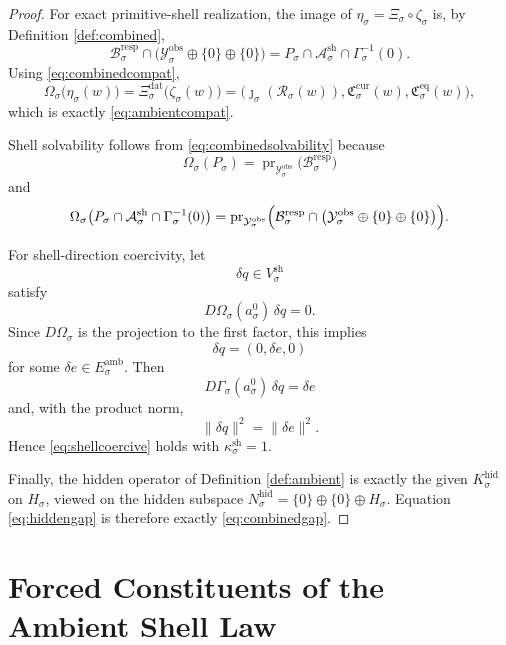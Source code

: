 \documentclass[11pt]{article}
\newcommand{\Reduction}[1]{\mathcal R_{#1}}
\newcommand{\CurrentCarrier}[1]{\mathfrak C_{#1}^{\mathrm{cur}}}
\newcommand{\EqCarrier}[1]{\mathfrak C_{#1}^{\mathrm{eq}}}
\newcommand{\DataSpace}[1]{\mathcal Y_{#1}^{\mathrm{obs}}}
\newcommand{\AmbientBody}[1]{P_{#1}}
\newcommand{\AmbientRead}[1]{\Omega_{#1}}
\newcommand{\AmbientShellLaw}[1]{\Gamma_{#1}}
\newcommand{\ShellAffine}[1]{\mathcal A_{#1}^{\mathrm{sh}}}
\newcommand{\ShellVector}[1]{V_{#1}^{\mathrm{sh}}}
\newcommand{\HiddenSpace}[1]{N_{#1}^{\mathrm{hid}}}
\newcommand{\HiddenOperator}[1]{K_{#1}^{\mathrm{hid}}}
\newcommand{\AmbientEmbed}[1]{\eta_{#1}}
\newcommand{\AmbientRef}[1]{a_{#1}^{0}}
\newcommand{\AmbientTarget}[1]{E_{#1}^{\mathrm{amb}}}
\newcommand{\ResponseMap}[1]{\Xi_{#1}}
\newcommand{\ResponseData}[1]{\Xi_{#1}^{\mathrm{dat}}}
\newcommand{\ResponseImage}[1]{\mathcal B_{#1}^{\mathrm{resp}}}
\newcommand{\GapSpace}[1]{H_{#1}}
\newcommand{\ProtoEmbed}[1]{\zeta_{#1}}
\begin{document}
\begin{proof}
For exact primitive-shell realization, the image of \(\AmbientEmbed{\sigma}=\ResponseMap{\sigma}\circ\ProtoEmbed{\sigma}\) is, by Definition \ref{def:combined},
\[
\ResponseImage{\sigma}\cap
\bigl(
\DataSpace{\sigma}\oplus\{0\}\oplus\{0\}
\bigr)
=
\AmbientBody{\sigma}\cap \ShellAffine{\sigma}\cap \AmbientShellLaw{\sigma}^{-1}(0).
\]
Using \eqref{eq:combinedcompat},
\[
\AmbientRead{\sigma}\bigl(\AmbientEmbed{\sigma}(w)\bigr)
=
\ResponseData{\sigma}\bigl(\ProtoEmbed{\sigma}(w)\bigr)
=
\bigl(
\jmath_{\sigma}(\Reduction{\sigma}(w)),
\CurrentCarrier{\sigma}(w),
\EqCarrier{\sigma}(w)
\bigr),
\]
which is exactly \eqref{eq:ambientcompat}.

Shell solvability follows from \eqref{eq:combinedsolvability} because
\[
\AmbientRead{\sigma}(\AmbientBody{\sigma})
=
\operatorname{pr}_{\DataSpace{\sigma}}\bigl(\ResponseImage{\sigma}\bigr)
\]
and
\[
\AmbientRead{\sigma}
\bigl(
\AmbientBody{\sigma}\cap
\ShellAffine{\sigma}\cap
\AmbientShellLaw{\sigma}^{-1}(0)
\bigr)
=
\operatorname{pr}_{\DataSpace{\sigma}}
\Bigl(
\ResponseImage{\sigma}\cap
\bigl(
\DataSpace{\sigma}\oplus\{0\}\oplus\{0\}
\bigr)
\Bigr).
\]

For shell-direction coercivity, let
\[
\delta q\in \ShellVector{\sigma}
\]
satisfy
\[
D\AmbientRead{\sigma}(\AmbientRef{\sigma})\,\delta q=0.
\]
Since \(D\AmbientRead{\sigma}\) is the projection to the first factor, this implies
\[
\delta q=(0,\delta e,0)
\]
for some \(\delta e\in\AmbientTarget{\sigma}\). Then
\[
D\AmbientShellLaw{\sigma}(\AmbientRef{\sigma})\,\delta q
=
\delta e
\]
and, with the product norm,
\[
\|\delta q\|^{2}=\|\delta e\|^{2}.
\]
Hence \eqref{eq:shellcoercive} holds with \(\kappa_{\sigma}^{\mathrm{sh}}=1\).

Finally, the hidden operator of Definition \ref{def:ambient} is exactly the given \(\HiddenOperator{\sigma}\) on \(\GapSpace{\sigma}\), viewed on the hidden subspace \(\HiddenSpace{\sigma}=\{0\}\oplus\{0\}\oplus\GapSpace{\sigma}\). Equation \eqref{eq:hiddengap} is therefore exactly \eqref{eq:combinedgap}.
\end{proof}

\section{Forced Constituents of the Ambient Shell Law}
\end{document}
